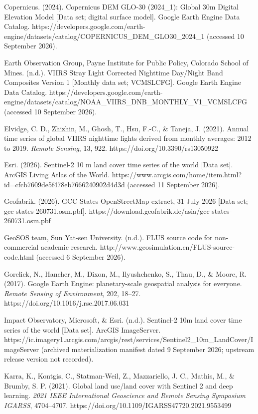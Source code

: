 Copernicus. (2024). Copernicus DEM GLO-30 (2024\_1): Global 30m Digital
Elevation Model {[}Data set; digital surface model{]}. Google Earth
Engine Data Catalog.
https://developers.google.com/earth-engine/datasets/catalog/COPERNICUS\_DEM\_GLO30\_2024\_1
(accessed 10 September 2026).

Earth Observation Group, Payne Institute for Public Policy, Colorado
School of Mines. (n.d.). VIIRS Stray Light Corrected Nighttime Day/Night
Band Composites Version 1 {[}Monthly data set; VCMSLCFG{]}. Google Earth
Engine Data Catalog.
https://developers.google.com/earth-engine/datasets/catalog/NOAA\_VIIRS\_DNB\_MONTHLY\_V1\_VCMSLCFG
(accessed 10 September 2026).

Elvidge, C. D., Zhizhin, M., Ghosh, T., Hsu, F.-C., \& Taneja, J.
(2021). Annual time series of global VIIRS nighttime lights derived from
monthly averages: 2012 to 2019. \emph{Remote Sensing}, 13, 922.
https://doi.org/10.3390/rs13050922

Esri. (2026). Sentinel-2 10 m land cover time series of the world
{[}Data set{]}. ArcGIS Living Atlas of the World.
https://www.arcgis.com/home/item.html?id=cfcb7609de5f478eb7666240902d4d3d
(accessed 11 September 2026).

Geofabrik. (2026). GCC States OpenStreetMap extract, 31 July 2026
{[}Data set; gcc-states-260731.osm.pbf{]}.
https://download.geofabrik.de/asia/gcc-states-260731.osm.pbf

GeoSOS team, Sun Yat-sen University. (n.d.). FLUS source code for
non-commercial academic research.
http://www.geosimulation.cn/FLUS-source-code.html (accessed 6 September
2026).

Gorelick, N., Hancher, M., Dixon, M., Ilyushchenko, S., Thau, D., \&
Moore, R. (2017). Google Earth Engine: planetary-scale geospatial
analysis for everyone. \emph{Remote Sensing of Environment}, 202,
18--27. https://doi.org/10.1016/j.rse.2017.06.031

Impact Observatory, Microsoft, \& Esri. (n.d.). Sentinel-2 10m land
cover time series of the world {[}Data set{]}. ArcGIS ImageServer.
https://ic.imagery1.arcgis.com/arcgis/rest/services/Sentinel2\_10m\_LandCover/ImageServer
(archived materialization manifest dated 9 September 2026; upstream
release version not recorded).

Karra, K., Kontgis, C., Statman-Weil, Z., Mazzariello, J. C., Mathis,
M., \& Brumby, S. P. (2021). Global land use/land cover with Sentinel 2
and deep learning. \emph{2021 IEEE International Geoscience and Remote
Sensing Symposium IGARSS}, 4704--4707.
https://doi.org/10.1109/IGARSS47720.2021.9553499

